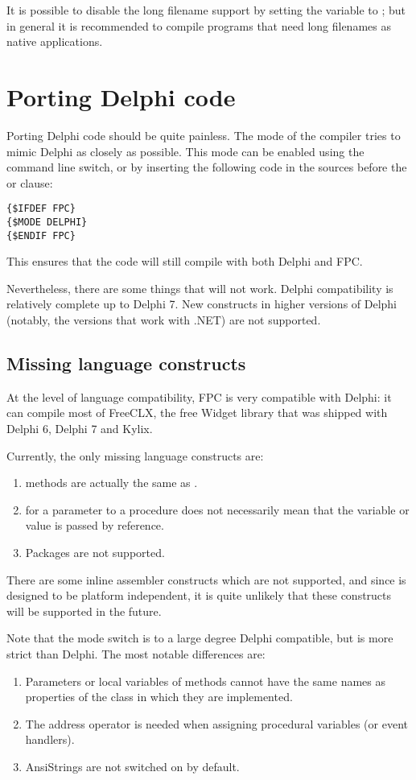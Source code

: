 It is possible to disable the long filename support by setting the
 variable to ; but in general it is recommended
to compile programs that need long filenames as native \windows applications.

\section{Porting Delphi code}

Porting Delphi code should be quite painless. The  mode of the 
compiler tries to mimic Delphi as closely as possible. 
This mode can be enabled using the  command line switch, 
or by inserting the following code in the sources before the  
or  clause:
\begin{verbatim}
{$IFDEF FPC}
{$MODE DELPHI}
{$ENDIF FPC}
\end{verbatim}
This ensures that the code will still compile with both Delphi and FPC.

Nevertheless, there are some things that will not work. 
Delphi compatibility is relatively complete up to Delphi 7. 
New constructs in higher versions of Delphi 
(notably, the versions that work with .NET) are not supported.

\subsection{Missing language constructs}
At the level of language compatibility, FPC is very compatible with Delphi:
it can compile most of FreeCLX, the free Widget library that was shipped 
with Delphi 6, Delphi 7 and Kylix.

Currently, the only missing language constructs are:
\begin{enumerate}
\item {} methods are actually the same as .
\item {} for a parameter to a procedure does not necessarily 
mean that the variable or value is passed by reference.
\item Packages are not supported.
\end{enumerate}

There are some inline assembler constructs which are not supported, 
and since \fpc is designed to be platform independent, it is quite 
unlikely that these constructs will be supported in the future.

Note that the  mode switch is to a large degree Delphi 
compatible, but is more strict than Delphi. The most notable differences
are:
\begin{enumerate}
\item Parameters or local variables of methods cannot have the same 
names as properties of the class in which they are implemented.
\item The address operator is needed when assigning procedural variables (or event handlers).
\item AnsiStrings are not switched on by default.
\end{enumerate}

